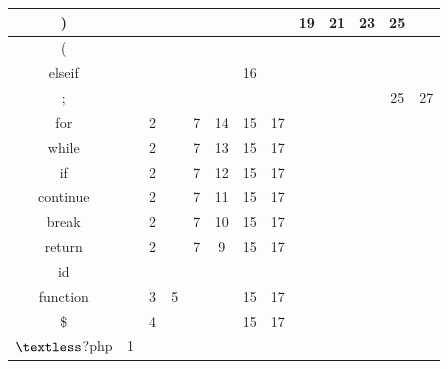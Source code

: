 \documentclass[12pt,a4paper,titlepage,final]{article}
\begin{document}
\begin{landscape}
\begin{table}
\begin{small}
\begin{tabular}{|c|c|c|c|c|c|c|c|c|c|c|c|c|}
    )        & ~    & ~    & ~    & ~         & ~    & ~           & ~         & 19         & 21          & 23      & 25        & ~         \\ \hline
    (        & ~    & ~    & ~    & ~         & ~    & ~           & ~         & ~          & ~           & ~       & ~         & ~         \\ \hline
    elseif   & ~    & ~    & ~    & ~         & ~    & 16          & ~         & ~          & ~           & ~       & ~         & ~         \\ \hline
    ;        & ~    & ~    & ~    & ~         & ~    & ~           & ~         & ~          & ~           & ~       & 25        & 27        \\ \hline
    for      & ~    & 2    & ~    & 7         & 14   & 15          & 17        & ~          & ~           & ~       & ~         & ~         \\ \hline
    while    & ~    & 2    & ~    & 7         & 13   & 15          & 17        & ~          & ~           & ~       & ~         & ~         \\ \hline
    if       & ~    & 2    & ~    & 7         & 12   & 15          & 17        & ~          & ~           & ~       & ~         & ~         \\ \hline
    continue & ~    & 2    & ~    & 7         & 11   & 15          & 17        & ~          & ~           & ~       & ~         & ~         \\ \hline
    break    & ~    & 2    & ~    & 7         & 10   & 15          & 17        & ~          & ~           & ~       & ~         & ~         \\ \hline
    return   & ~    & 2    & ~    & 7         & 9    & 15          & 17        & ~          & ~           & ~       & ~         & ~         \\ \hline
    id       & ~    & ~    & ~    & ~         & ~    & ~           & ~         & ~          & ~           & ~       & ~         & ~         \\ \hline
    function & ~    & 3    & 5    & ~         & ~    & 15          & 17        & ~          & ~           & ~       & ~         & ~         \\ \hline
    \$       & ~    & 4    & ~    & ~         & ~    & 15          & 17        & ~          & ~           & ~       & ~         & ~         \\ \hline
    $\textless$?php      & 1    & ~    & ~    & ~         & ~    & ~           & ~         & ~          & ~           & ~       & ~         & ~         \\ \hline
    \end{tabular}
    \end{small}
\end{table}
    \end{landscape}
    \clearpage%
\newpage
\end{document}
